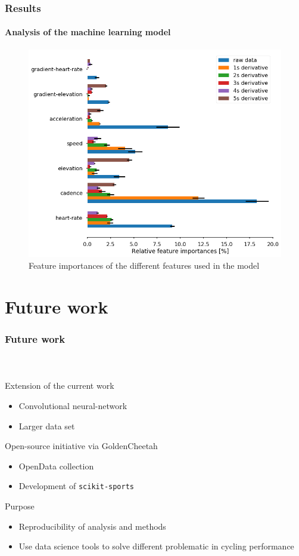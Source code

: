 \documentclass{beamer}
\newcommand{\tick}{\color{green!60!black!80}\ding{51}}
\newcommand{\cross}{\color{red!60!black!80}\ding{55}}
\begin{document}
\begin{frame}
  \frametitle{Results}
  \framesubtitle{Analysis of the machine learning model}
  \begin{figure}
    \includegraphics[width=.7\textwidth]{./images/feature_importances.png}
    \caption{Feature importances of the different features used in the model}
  \end{figure}
\end{frame}

\section{Future work}

\begin{frame}
  \frametitle{Future work}
  \framesubtitle{\ }
  \begin{block}{\small Extension of the current work}
    \begin{itemize}\small
    \item[\tick] Convolutional neural-network
    \item[\cross] Larger data set
    \end{itemize}
  \end{block}
  \begin{block}{\small Open-source initiative via GoldenCheetah}
    \begin{itemize}\small
    \item OpenData collection
    \item Development of \texttt{scikit-sports}
    \end{itemize}
  \end{block}
  \begin{block}{\small Purpose}
    \begin{itemize}\small
    \item[\tick] Reproducibility of analysis and methods
    \item[\tick] Use data science tools to solve different problematic in
      cycling performance 
    \end{itemize}
  \end{block}
\end{frame}
\end{document}
